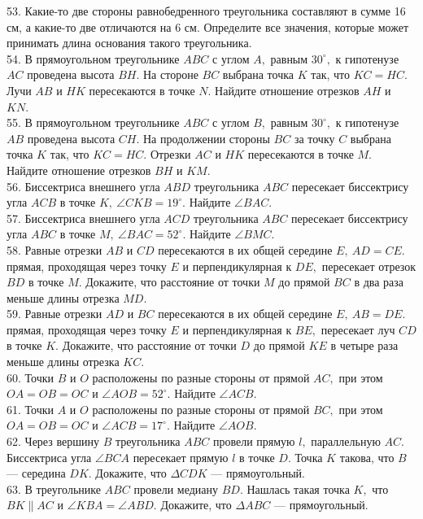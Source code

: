 \documentclass[12pt]{article}
\begin{document}
53. Какие-то две стороны равнобедренного треугольника составляют в сумме 16 см, а какие-то две отличаются на 6 см. Определите все значения, которые может принимать длина основания такого треугольника.\\
54. В прямоугольном треугольнике $ABC$ с углом $A,$ равным $30^\circ,$ к гипотенузе $AC$ проведена высота $BH.$ На стороне $BC$ выбрана точка $K$ так, что $KC=HC.$ Лучи $AB$ и $HK$ пересекаются в точке $N.$ Найдите отношение отрезков $AH$ и $KN.$\\
55.  В прямоугольном треугольнике $ABC$ с углом $B,$ равным $30^\circ,$ к гипотенузе $AB$ проведена высота $CH.$ На продолжении стороны $BC$ за точку $C$ выбрана точка $K$ так, что $KC=HC.$ Отрезки $AC$ и $HK$ пересекаются в точке $M.$ Найдите отношение отрезков $BH$ и $KM.$\\
56. Биссектриса внешнего угла $ABD$ треугольника $ABC$ пересекает биссектрису угла $ACB$ в точке $K,\ \angle CKB=19^\circ.$ Найдите $\angle BAC.$\\
57. Биссектриса внешнего угла $ACD$ треугольника $ABC$ пересекает биссектрису угла $ABC$ в точке $M,\ \angle BAC=52^\circ.$ Найдите $\angle BMC.$\\
58. Равные отрезки $AB$ и $CD$ пересекаются в их общей середине $E,\ AD=CE.$ прямая, проходящая через точку $E$ и перпендикулярная к $DE,$ пересекает отрезок $BD$ в точке $M.$ Докажите, что расстояние от точки $M$ до прямой $BC$ в два раза меньше длины отрезка $MD.$\\
59. Равные отрезки $AD$ и $BC$ пересекаются в их общей середине $E,\ AB=DE.$ прямая, проходящая через точку $E$ и перпендикулярная к $BE,$ пересекает луч $CD$ в точке $K.$ Докажите, что расстояние от точки $D$ до прямой $KE$ в четыре раза меньше длины отрезка $KC.$\\
60. Точки $B$ и $O$ расположены по разные стороны от прямой $AC,$ при этом  $OA=OB=OC$ и $\angle AOB = 52^\circ.$ Найдите $\angle ACB.$\\
61. Точки $A$ и $O$ расположены по разные стороны от прямой $BC,$ при этом  $OA=OB=OC$ и $\angle ACB= 17  ^\circ.$ Найдите $\angle AOB.$\\
62. Через вершину $B$ треугольника $ABC$ провели прямую $l,$ параллельную $AC.$ Биссектриса угла $\angle BCA$ пересекает прямую $l$ в точке $D.$ Точка $K$ такова, что $B$ --- середина $DK.$ Докажите, что $\Delta CDK$ --- прямоугольный.\\
63. В треугольнике $ABC$ провели медиану $BD.$ Нашлась такая точка $K,$ что $BK\parallel AC$ и $\angle KBA=\angle ABD.$ Докажите, что $\Delta ABC$ --- прямоугольный.\\
\end{document}
